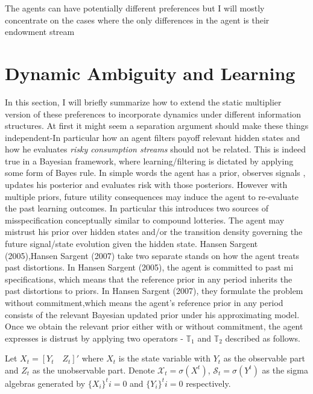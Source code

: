 \documentclass[12pt]{article}
\begin{document}
\noindent The agents can have potentially different preferences but I will mostly concentrate on the cases where the only differences in the agent is their endowment stream
\section{Dynamic Ambiguity and Learning}
In this section, I will briefly summarize how to extend the static multiplier version of these preferences to incorporate dynamics under different information structures. At first it might seem a separation argument should make these things independent-In particular how an agent filters payoff relevant hidden states and how he evaluates \emph{ risky consumption streams} should not be related. This is indeed true in a Bayesian framework, where learning/filtering is dictated by applying some form of Bayes rule. In simple words the agent has a prior, observes signals , updates his posterior and evaluates risk with those posteriors. However with multiple priors, future utility consequences may induce the agent to re-evaluate the past learning outcomes. In particular this introduces two sources of misspecification conceptually similar to compound lotteries. The agent may mistrust his prior over hidden states and/or the transition density governing the future signal/state evolution given the  hidden state. Hansen Sargent (2005),Hansen Sargent (2007) take two separate stands on how the agent treats past distortions. In Hansen Sargent (2005), the agent is committed to past mi specifications, which means that the reference prior in any period inherits the past distortions to priors. In Hansen Sargent (2007), they formulate the problem without commitment,which means the agent's reference prior in any period consists of the relevant Bayesian updated prior under his approximating model. Once we obtain the relevant prior either with or without commitment, the agent expresses is distrust by applying two operators - $\mathbb{T}_1$ and $\mathbb{T}_2$  described as follows.


\noindent Let $X_t=[Y_t \quad Z_t]'$ where $X_t$ is the state variable with $Y_t$ as the observable part and $Z_t$ as the unobservable part. Denote $\mathcal{X}_t = \sigma(X^t)$, $\mathcal{S}_t=\sigma(Y^t)$ as the sigma algebras generated by $\{X_i\}^{t}{i=0}$ and $\{Y_i\}^{t}{i=0}$ respectively. 
\end{document}
